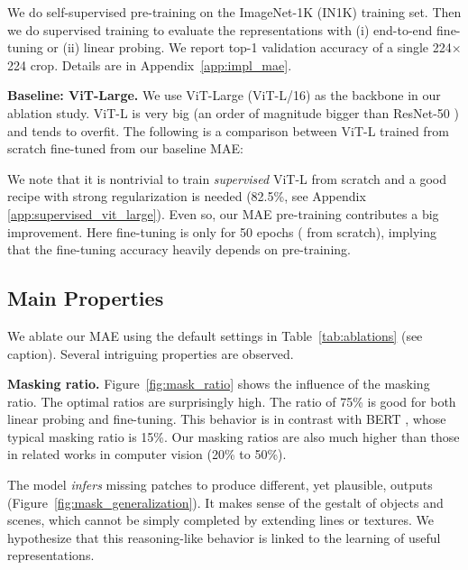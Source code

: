 We do self-supervised pre-training on the ImageNet-1K (IN1K) \cite{Deng2009} training set. Then we do supervised training to evaluate the representations with (i) end-to-end fine-tuning or (ii) linear probing. We report top-1 validation accuracy of a single 224$\times$224 crop. Details are in Appendix~\ref{app:impl_mae}.

\textbf{Baseline: ViT-Large.} We use {ViT-Large} (ViT-L/16) \cite{Dosovitskiy2021} as the backbone in our ablation study. ViT-L is very big (an order of magnitude bigger than ResNet-50 \cite{He2016}) and tends to overfit. The following is a comparison between ViT-L trained from scratch \vs fine-tuned from our baseline MAE:

\begin{center}

\end{center}

We note that it is nontrivial to train \textit{supervised} ViT-L from scratch and a good recipe with strong regularization is needed (82.5\%, see Appendix \ref{app:supervised_vit_large}). Even so, our MAE pre-training contributes a big improvement. Here fine-tuning is only for 50 epochs ( from scratch), implying that the fine-tuning accuracy heavily depends on pre-training.

\subsection{Main Properties}

We ablate our MAE using the default settings in Table~\ref{tab:ablations} (see caption). Several intriguing properties are observed.

\textbf{Masking ratio.} Figure~\ref{fig:mask_ratio} shows the influence of the masking ratio. The optimal ratios are surprisingly high. The ratio of 75\% is good for both linear probing and fine-tuning. This behavior is in contrast with BERT \cite{Devlin2019}, whose typical masking ratio is 15\%. Our masking ratios are also much higher than those in related works \cite{Chen2020c,Dosovitskiy2021,Bao2021} in computer vision (20\% to 50\%).

The model \textit{infers} missing patches to produce different, yet plausible, outputs (Figure~\ref{fig:mask_generalization}). It makes sense of the gestalt of objects and scenes, which cannot be simply completed by extending lines or textures. We hypothesize that this reasoning-like behavior is linked to the learning of useful representations.

